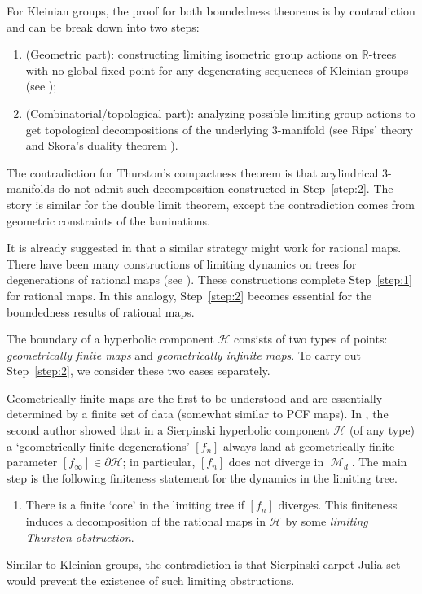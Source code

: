 \documentclass[11pt, reqno]{amsart}
\numberwithin{equation}{section}
\theoremstyle{plain}
\theoremstyle{theorem}
\theoremstyle{plain}
\theoremstyle{definition}
\newcommand{\R}{\mathbb{R}}
\DeclareMathOperator{\M}{\mathcal{M}}
\numberwithin{figure}{section}
\begin{document}
For Kleinian groups, the proof for both boundedness theorems is by contradiction and can be break down into two steps:
\begin{enumerate}[label=\text{(\Alph*)},font=\normalfont,leftmargin=*]
\item \label{step:1}(Geometric part): constructing limiting isometric group actions on $\R$-trees with no global fixed point for any degenerating sequences of Kleinian groups (see \cite{MorganShalen84, Bestvina88, Paulin88});
\item \label{step:2} (Combinatorial/topological part): analyzing possible limiting group actions to get topological decompositions of the underlying 3-manifold (see Rips' theory \cite{Kap10} and Skora's duality theorem \cite{Sko96}).
\end{enumerate}
The contradiction for Thurston's compactness theorem is that acylindrical 3-manifolds do not admit such decomposition constructed in Step~\ref{step:2}. The story is similar for the double limit theorem, except the contradiction comes from geometric constraints of the laminations.

It is already suggested in \cite{McM95} that a similar strategy might work for rational maps.
There have been many constructions of limiting dynamics on trees for degenerations of rational maps (see \cite{McM09, Kiwi15, Luo19a, Luo19b, FG24}). These constructions complete Step~\ref{step:1} for rational maps. In this analogy, Step~\ref{step:2} becomes essential for the boundedness results of rational maps. 




The boundary of a hyperbolic component $\mathcal{H}$ consists of two types of points: {\em geometrically finite maps} and {\em geometrically infinite maps}.
To carry out Step~\ref{step:2}, we consider these two cases separately.


Geometrically finite maps are the first to be understood and are essentially determined by a finite set of data (somewhat similar to PCF maps). In \cite{Luo21b}, the second author showed that in a Sierpinski hyperbolic component $\mathcal{H}$ (of any type) a `geometrically finite degenerations' $[f_n]$ always land at geometrically finite parameter $[f_\infty]\in \partial \mathcal{H}$; in particular, $[f_n]$ does not diverge in $\M_d$.  The main step is the following finiteness statement for the dynamics in the limiting tree.
\begin{enumerate}[label=\text{(\alph*)},start=2,font=\normalfont,leftmargin=*]
\item\label{item:b:intro} There is a finite `core' in the limiting tree if $[f_n]$ diverges.
This finiteness induces a decomposition of the rational maps in $\mathcal{H}$ by some {\em limiting Thurston obstruction}.
\end{enumerate}
Similar to Kleinian groups, the contradiction is that Sierpinski carpet Julia set would prevent the existence of such limiting obstructions.
\end{document}
